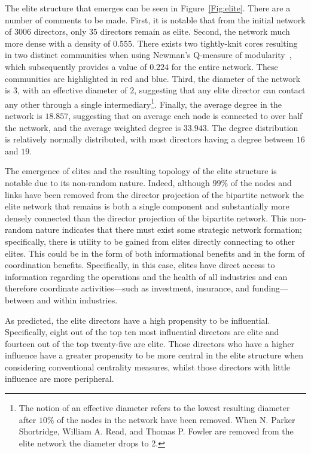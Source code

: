 \documentclass[11pt,fleqn]{article}
\begin{document}
The elite structure that emerges can be seen in Figure~\ref{Fig:elite}. There are a number of comments to be made. First, it is notable that from the initial network of $3006$ directors, only $35$ directors remain as elite. Second, the network much more dense with a density of $0.555$. There exists two tightly-knit cores resulting in two distinct communities when using Newman's Q-measure of modularity~\citep{Newman2006}, which subsequently provides a value of $0.224$ for the entire network. These communities are highlighted in red and blue. Third, the diameter of the network is $3$, with an effective diameter of $2$, suggesting that any elite director can contact any other through a single intermediary\footnote{The notion of an effective diameter refers to the lowest resulting diameter after $10\%$ of the nodes in the network have been removed. When N. Parker Shortridge, William A. Read, and Thomas P. Fowler are removed from the elite network the diameter drops to 2.}. Finally, the average degree in the network is $18.857$, suggesting that on average each node is connected to over half the network, and the average weighted degree is $33.943$. The degree distribution is relatively normally distributed, with most directors having a degree between $16$ and $19$.

The emergence of elites and the resulting topology of the elite structure is notable due to its non-random nature. Indeed, although $99\%$ of the nodes and links have been removed from the director projection of the bipartite network the elite network that remains is both a single component and substantially more densely connected than the director projection of the bipartite network. This non-random nature indicates that there must exist some strategic network formation; specifically, there is utility to be gained from elites directly connecting to other elites. This could be in the form of both informational benefits and in the form of coordination benefits. Specifically, in this case, elites have direct access to information regarding the operations and the health of all industries and can therefore coordinate activities---such as investment, insurance, and funding---between and within industries.

As predicted, the elite directors have a high propensity to be influential. Specifically, eight out of the top ten most influential directors are elite and fourteen out of the top twenty-five are elite. Those directors who have a higher influence have a greater propensity to be more central in the elite structure when considering conventional centrality measures, whilst those directors with little influence are more peripheral.
\end{document}
